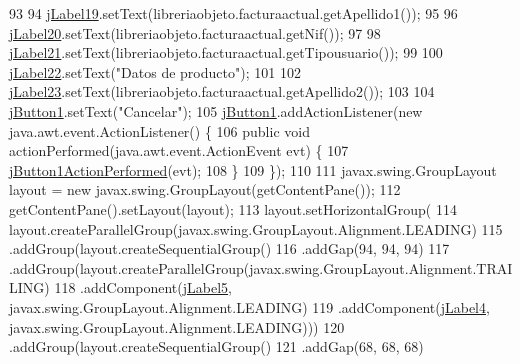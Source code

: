 \begin{DoxyCode}
93 
94         \mbox{\hyperlink{class_interfaz_package_1_1_interfaz_consulta_factura_a901a8d0df72dbe316e6945341e438f52}{jLabel19}}.setText(libreriaobjeto.facturaactual.getApellido1());
95 
96         \mbox{\hyperlink{class_interfaz_package_1_1_interfaz_consulta_factura_a66d5645db5c2843eaf50cd96457bb4b4}{jLabel20}}.setText(libreriaobjeto.facturaactual.getNif());
97 
98         \mbox{\hyperlink{class_interfaz_package_1_1_interfaz_consulta_factura_af22e036163f2449a57e02b294812cfc7}{jLabel21}}.setText(libreriaobjeto.facturaactual.getTipousuario());
99 
100         \mbox{\hyperlink{class_interfaz_package_1_1_interfaz_consulta_factura_a338924ad3911c841159af6eb75aa2473}{jLabel22}}.setText(\textcolor{stringliteral}{"Datos de producto"});
101 
102         \mbox{\hyperlink{class_interfaz_package_1_1_interfaz_consulta_factura_a1f75868545728f2ec9d78490ebcb8d39}{jLabel23}}.setText(libreriaobjeto.facturaactual.getApellido2());
103 
104         \mbox{\hyperlink{class_interfaz_package_1_1_interfaz_consulta_factura_a567e35d7d891c79841a45e5a58b8b917}{jButton1}}.setText(\textcolor{stringliteral}{"Cancelar"});
105         \mbox{\hyperlink{class_interfaz_package_1_1_interfaz_consulta_factura_a567e35d7d891c79841a45e5a58b8b917}{jButton1}}.addActionListener(\textcolor{keyword}{new} java.awt.event.ActionListener() \{
106             \textcolor{keyword}{public} \textcolor{keywordtype}{void} actionPerformed(java.awt.event.ActionEvent evt) \{
107                 \mbox{\hyperlink{class_interfaz_package_1_1_interfaz_consulta_factura_a794125608e988abb2f24a5506f65bacc}{jButton1ActionPerformed}}(evt);
108             \}
109         \});
110 
111         javax.swing.GroupLayout layout = \textcolor{keyword}{new} javax.swing.GroupLayout(getContentPane());
112         getContentPane().setLayout(layout);
113         layout.setHorizontalGroup(
114             layout.createParallelGroup(javax.swing.GroupLayout.Alignment.LEADING)
115             .addGroup(layout.createSequentialGroup()
116                 .addGap(94, 94, 94)
117                 .addGroup(layout.createParallelGroup(javax.swing.GroupLayout.Alignment.TRAILING)
118                     .addComponent(\mbox{\hyperlink{class_interfaz_package_1_1_interfaz_consulta_factura_a375c733d68f59477fc27bdeb6ea2dae9}{jLabel5}}, javax.swing.GroupLayout.Alignment.LEADING)
119                     .addComponent(\mbox{\hyperlink{class_interfaz_package_1_1_interfaz_consulta_factura_a7d36559d1213a95e83abba6d9c92199b}{jLabel4}}, javax.swing.GroupLayout.Alignment.LEADING)))
120             .addGroup(layout.createSequentialGroup()
121                 .addGap(68, 68, 68)

\end{DoxyCode}
